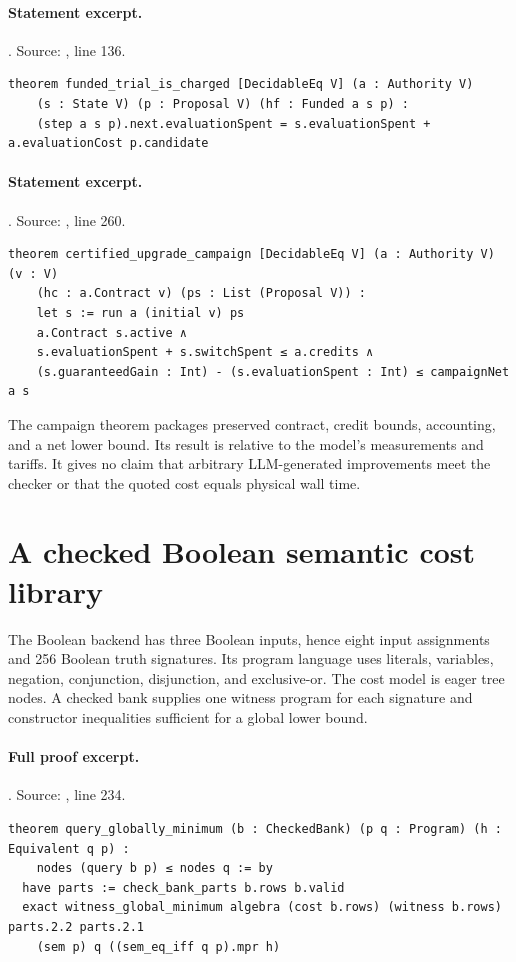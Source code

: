 \documentclass[11pt]{article}
\begin{document}
\paragraph{Statement excerpt.}. Source: , line 136.
\begin{lstlisting}[style=AVOCSource]
theorem funded_trial_is_charged [DecidableEq V] (a : Authority V)
    (s : State V) (p : Proposal V) (hf : Funded a s p) :
    (step a s p).next.evaluationSpent = s.evaluationSpent + a.evaluationCost p.candidate
\end{lstlisting}

\paragraph{Statement excerpt.}. Source: , line 260.
\begin{lstlisting}[style=AVOCSource]
theorem certified_upgrade_campaign [DecidableEq V] (a : Authority V) (v : V)
    (hc : a.Contract v) (ps : List (Proposal V)) :
    let s := run a (initial v) ps
    a.Contract s.active ∧
    s.evaluationSpent + s.switchSpent ≤ a.credits ∧
    (s.guaranteedGain : Int) - (s.evaluationSpent : Int) ≤ campaignNet a s
\end{lstlisting}


The campaign theorem packages preserved contract, credit bounds, accounting,
and a net lower bound. Its result is relative to the model's measurements and
tariffs. It gives no claim that arbitrary LLM-generated improvements meet the
checker or that the quoted cost equals physical wall time.

\section{A checked Boolean semantic cost library}
The Boolean backend has three Boolean inputs, hence eight input assignments and
256 Boolean truth signatures. Its program language uses literals, variables,
negation, conjunction, disjunction, and exclusive-or. The cost model is eager
tree nodes. A checked bank supplies one witness program for each signature and
constructor inequalities sufficient for a global lower bound.

\paragraph{Full proof excerpt.}. Source: , line 234.
\begin{lstlisting}[style=AVOCSource]
theorem query_globally_minimum (b : CheckedBank) (p q : Program) (h : Equivalent q p) :
    nodes (query b p) ≤ nodes q := by
  have parts := check_bank_parts b.rows b.valid
  exact witness_global_minimum algebra (cost b.rows) (witness b.rows) parts.2.2 parts.2.1
    (sem p) q ((sem_eq_iff q p).mpr h)
\end{lstlisting}
\end{document}
